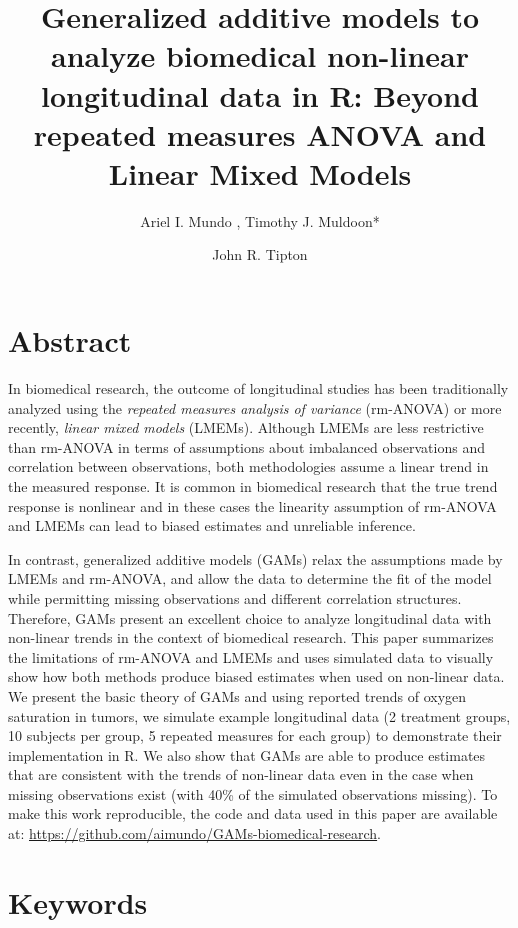 \documentclass[
]{article}
\title{\textbf{Generalized additive models to analyze biomedical non-linear longitudinal data in R: Beyond repeated measures ANOVA and Linear Mixed Models}}
\date{\vspace{-2.5em}}
\author{Ariel I. Mundo \orcidaffila{}, Timothy J. Muldoon*}
\affil{Department of Biomedical Engineering, University of Arkansas, Fayetteville, AR, USA}
\affil{\normalfont {tmuldoon@uark.edu}}
\author{John R. Tipton \orcidaffilb{}}
\affil{Department of Mathematical Sciences, University of Arkansas, Fayetteville, AR, USA}
\begin{document}
\maketitle

\hypertarget{abstract}{%
\section{Abstract}\label{abstract}}

In biomedical research, the outcome of longitudinal studies has been traditionally analyzed using the \emph{repeated measures analysis of variance} (rm-ANOVA) or more recently, \emph{linear mixed models} (LMEMs). Although LMEMs are less restrictive than rm-ANOVA in terms of assumptions about imbalanced observations and correlation between observations, both methodologies assume a linear trend in the measured response. It is common in biomedical research that the true trend response is nonlinear and in these cases the linearity assumption of rm-ANOVA and LMEMs can lead to biased estimates and unreliable inference.

In contrast, generalized additive models (GAMs) relax the assumptions made by LMEMs and rm-ANOVA, and allow the data to determine the fit of the model while permitting missing observations and different correlation structures. Therefore, GAMs present an excellent choice to analyze longitudinal data with non-linear trends in the context of biomedical research. This paper summarizes the limitations of rm-ANOVA and LMEMs and uses simulated data to visually show how both methods produce biased estimates when used on non-linear data. We present the basic theory of GAMs and using reported trends of oxygen saturation in tumors, we simulate example longitudinal data (2 treatment groups, 10 subjects per group, 5 repeated measures for each group) to demonstrate their implementation in R. We also show that GAMs are able to produce estimates that are consistent with the trends of non-linear data even in the case when missing observations exist (with 40\% of the simulated observations missing). To make this work reproducible, the code and data used in this paper are available at: \url{https://github.com/aimundo/GAMs-biomedical-research}.

\hypertarget{keywords}{%
\section*{Keywords}\label{keywords}}
\end{document}
